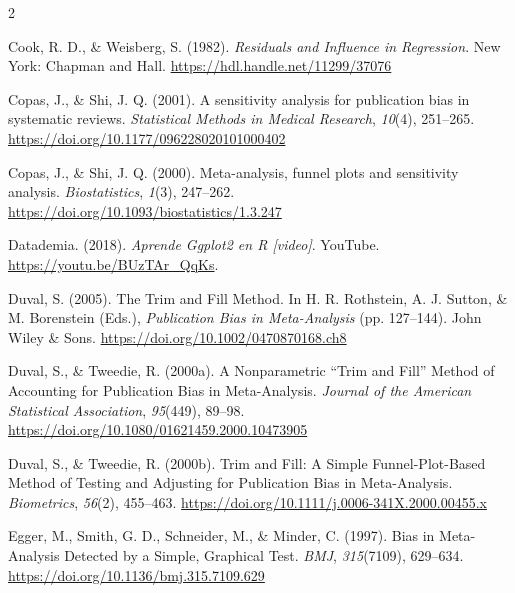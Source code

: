 \documentclass[
  bookmarksnumbered]{article}
\newlength{\cslhangindent}
\newlength{\cslentryspacingunit} %
\newenvironment{CSLReferences}[2] %
 {%
  \setlength{\parindent}{0pt}
  \ifodd #1
  \let\oldpar\par
  \def\par{\hangindent=\cslhangindent\oldpar}
  \fi
  \setlength{\parskip}{#2\cslentryspacingunit}
 }%
 {}
\begin{document}
\begin{multicols}{2}
\begin{CSLReferences}{1}{0}
\leavevmode{}%
Cook, R. D., \& Weisberg, S. (1982). \emph{Residuals and {Influence} in {Regression}}. {New York: Chapman and Hall}. \url{https://hdl.handle.net/11299/37076}

\leavevmode{}%
Copas, J., \& Shi, J. Q. (2001). A sensitivity analysis for publication bias in systematic reviews. \emph{Statistical Methods in Medical Research}, \emph{10}(4), 251--265. \url{https://doi.org/10.1177/096228020101000402}

\leavevmode{}%
Copas, J., \& Shi, J. Q. (2000). Meta-analysis, funnel plots and sensitivity analysis. \emph{Biostatistics}, \emph{1}(3), 247--262. \url{https://doi.org/10.1093/biostatistics/1.3.247}

\leavevmode{}%
Datademia. (2018). \emph{Aprende {Ggplot2} en {R} \emph{{[}video{]}}}. YouTube. \url{https://youtu.be/BUzTAr_QqKs}.

\leavevmode{}%
Duval, S. (2005). The {Trim} and {Fill Method}. In H. R. Rothstein, A. J. Sutton, \& M. Borenstein (Eds.), \emph{Publication {Bias} in {Meta-Analysis}} (pp. 127--144). {John Wiley \& Sons}. \url{https://doi.org/10.1002/0470870168.ch8}

\leavevmode{}%
Duval, S., \& Tweedie, R. (2000a). A {Nonparametric} {``{Trim} and {Fill}''} {Method} of {Accounting} for {Publication Bias} in {Meta-Analysis}. \emph{Journal of the American Statistical Association}, \emph{95}(449), 89--98. \url{https://doi.org/10.1080/01621459.2000.10473905}

\leavevmode{}%
Duval, S., \& Tweedie, R. (2000b). Trim and {Fill}: {A Simple Funnel-Plot-Based Method} of {Testing} and {Adjusting} for {Publication Bias} in {Meta-Analysis}. \emph{Biometrics}, \emph{56}(2), 455--463. \url{https://doi.org/10.1111/j.0006-341X.2000.00455.x}

\leavevmode{}%
Egger, M., Smith, G. D., Schneider, M., \& Minder, C. (1997). {Bias in Meta-Analysis Detected by a Simple, Graphical Test}. \emph{BMJ}, \emph{315}(7109), 629--634. \url{https://doi.org/10.1136/bmj.315.7109.629}


\end{CSLReferences}
\end{multicols}
\end{document}
